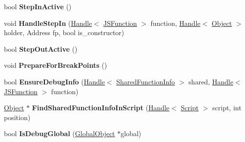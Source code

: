 \begin{DoxyCompactItemize}
\item 
\hypertarget{classv8_1_1internal_1_1_debug_a18e1343b7654d628803fc59844511f32}{}bool {\bfseries Step\+In\+Active} ()\label{classv8_1_1internal_1_1_debug_a18e1343b7654d628803fc59844511f32}

\item 
\hypertarget{classv8_1_1internal_1_1_debug_a32df281218164fd26c777cf83c7a75f3}{}void {\bfseries Handle\+Step\+In} (\hyperlink{classv8_1_1internal_1_1_handle}{Handle}$<$ \hyperlink{classv8_1_1internal_1_1_j_s_function}{J\+S\+Function} $>$ function, \hyperlink{classv8_1_1internal_1_1_handle}{Handle}$<$ \hyperlink{classv8_1_1internal_1_1_object}{Object} $>$ holder, Address fp, bool is\+\_\+constructor)\label{classv8_1_1internal_1_1_debug_a32df281218164fd26c777cf83c7a75f3}

\item 
\hypertarget{classv8_1_1internal_1_1_debug_a202df0ad5685f6cb13a5d5159cac8c69}{}bool {\bfseries Step\+Out\+Active} ()\label{classv8_1_1internal_1_1_debug_a202df0ad5685f6cb13a5d5159cac8c69}

\item 
\hypertarget{classv8_1_1internal_1_1_debug_a2fc6fee54c6aa15de9fc118393848d64}{}void {\bfseries Prepare\+For\+Break\+Points} ()\label{classv8_1_1internal_1_1_debug_a2fc6fee54c6aa15de9fc118393848d64}

\item 
\hypertarget{classv8_1_1internal_1_1_debug_a2b5827bbb925b95345d16a10c827b791}{}bool {\bfseries Ensure\+Debug\+Info} (\hyperlink{classv8_1_1internal_1_1_handle}{Handle}$<$ \hyperlink{classv8_1_1internal_1_1_shared_function_info}{Shared\+Function\+Info} $>$ shared, \hyperlink{classv8_1_1internal_1_1_handle}{Handle}$<$ \hyperlink{classv8_1_1internal_1_1_j_s_function}{J\+S\+Function} $>$ function)\label{classv8_1_1internal_1_1_debug_a2b5827bbb925b95345d16a10c827b791}

\item 
\hypertarget{classv8_1_1internal_1_1_debug_a84506797e261e46161d928ccf3b66f04}{}\hyperlink{classv8_1_1internal_1_1_object}{Object} $\ast$ {\bfseries Find\+Shared\+Function\+Info\+In\+Script} (\hyperlink{classv8_1_1internal_1_1_handle}{Handle}$<$ \hyperlink{classv8_1_1internal_1_1_script}{Script} $>$ script, int position)\label{classv8_1_1internal_1_1_debug_a84506797e261e46161d928ccf3b66f04}

\item 
\hypertarget{classv8_1_1internal_1_1_debug_ab2b6c98fb4da95b6991c97be22ee9fe5}{}bool {\bfseries Is\+Debug\+Global} (\hyperlink{classv8_1_1internal_1_1_global_object}{Global\+Object} $\ast$global)\label{classv8_1_1internal_1_1_debug_ab2b6c98fb4da95b6991c97be22ee9fe5}


\end{DoxyCompactItemize}
